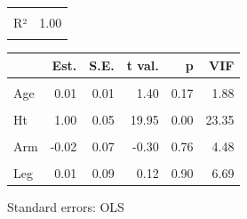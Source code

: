 \documentclass[
  ignorenonframetext,
]{beamer}
\begin{document}
\begin{frame}{}
\protect\hypertarget{section-12}{}
\begin{table}[!h]
\centering
\begin{tabular}{lr}
\toprule
\cellcolor{gray!6}{F(7,30)} & \cellcolor{gray!6}{1313.27}\\
R² & 1.00\\
\cellcolor{gray!6}{Adj. R²} & \cellcolor{gray!6}{1.00}\\
\bottomrule
\end{tabular}
\end{table} \begin{table}[!h]
\centering
\begin{threeparttable}
\begin{tabular}{lrrrrr}
\toprule
  & Est. & S.E. & t val. & p & VIF\\
\midrule
\cellcolor{gray!6}{(Intercept)} & \cellcolor{gray!6}{0.23} & \cellcolor{gray!6}{3.12} & \cellcolor{gray!6}{0.07} & \cellcolor{gray!6}{0.94} & \cellcolor{gray!6}{NA}\\
Age & 0.01 & 0.01 & 1.40 & 0.17 & 1.88\\
\cellcolor{gray!6}{Weight} & \cellcolor{gray!6}{-0.00} & \cellcolor{gray!6}{0.01} & \cellcolor{gray!6}{-0.39} & \cellcolor{gray!6}{0.70} & \cellcolor{gray!6}{3.63}\\
Ht & 1.00 & 0.05 & 19.95 & 0.00 & 23.35\\
\cellcolor{gray!6}{Seated} & \cellcolor{gray!6}{0.05} & \cellcolor{gray!6}{0.07} & \cellcolor{gray!6}{0.70} & \cellcolor{gray!6}{0.49} & \cellcolor{gray!6}{8.81}\\
\addlinespace
Arm & -0.02 & 0.07 & -0.30 & 0.76 & 4.48\\
\cellcolor{gray!6}{Thigh} & \cellcolor{gray!6}{-0.06} & \cellcolor{gray!6}{0.05} & \cellcolor{gray!6}{-1.25} & \cellcolor{gray!6}{0.22} & \cellcolor{gray!6}{2.63}\\
Leg & 0.01 & 0.09 & 0.12 & 0.90 & 6.69\\
\bottomrule
\end{tabular}
\begin{tablenotes}
\item Standard errors: OLS
\end{tablenotes}
\end{threeparttable}
\end{table}
\end{frame}
\end{document}
